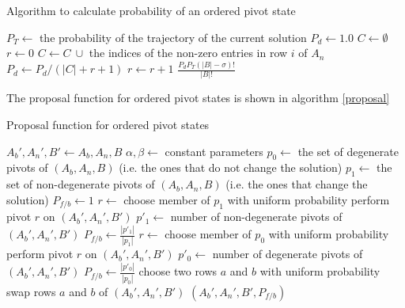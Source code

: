 \begin{algorithm}
\caption{Algorithm to calculate probability of an ordered pivot state}
\label{probAlgorithm}
\begin{algorithmic}
 
\State $P_T \leftarrow$ the probability of the trajectory of the current solution
\State $P_d \leftarrow 1.0$
\State $C \leftarrow \emptyset$
\State $r \leftarrow 0$
	\State $C \leftarrow C \ \cup $ the indices of the non-zero entries in row $i$ of $A_n$
	\State $P_d \leftarrow P_d/(|C|+r+1)$
	\State $r \leftarrow r + 1$
  \EndIf
\EndFor
\State \Return $\frac{P_d P_T(|B|-\sigma)!}{|B|!}$
\EndFunction
\end{algorithmic}
\end{algorithm}

The proposal function for ordered pivot states is shown in algorithm \ref{proposal}

\begin{algorithm}
\caption{Proposal function for ordered pivot states}
\label{proposal}
\begin{algorithmic}
 
\State $A_b',A_n',B' \leftarrow A_b,A_n,B$
\State $\alpha, \beta \leftarrow$ constant parameters
\State $p_0 \leftarrow$ the set of degenerate pivots of $(A_b,A_n,B)$ (i.e. the ones that do not change the solution)
\State $p_1 \leftarrow$ the set of non-degenerate pivots of $(A_b,A_n,B)$ (i.e. the ones that change the solution)
\State $P_{f/b} \leftarrow 1$ 
  \State $r \leftarrow$ choose member of $p_1$ with uniform probability
  \State perform pivot $r$ on $(A_b',A_n',B')$
  \State $p'_1 \leftarrow $ number of non-degenerate pivots of $(A_b',A_n',B')$
  \State $P_{f/b} \leftarrow \frac{|p'_1|}{|p_1|}$
  \State $r \leftarrow$ choose member of $p_0$ with uniform probability
  \State perform pivot $r$ on $(A_b',A_n',B')$
  \State $p'_0 \leftarrow $ number of degenerate pivots of $(A_b',A_n',B')$
  \State $P_{f/b} \leftarrow \frac{|p'_0|}{|p_0|}$
\Else
  \State choose two rows $a$ and $b$ with uniform probability
  \State swap rows $a$ and $b$ of $(A_b',A_n',B')$
\EndIf
\State \Return $(A_b',A_n',B',P_{f/b})$
\EndFunction
\end{algorithmic}
\end{algorithm}



